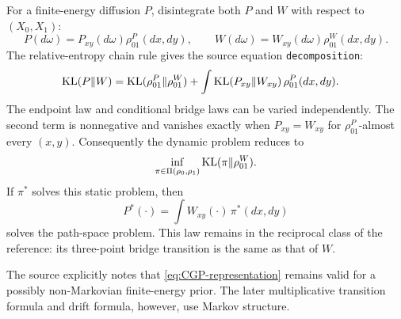 For a finite-energy diffusion $P$, disintegrate both $P$ and $W$ with respect to
$(X_0,X_1)$:
\[
 P(d\omega)=P_{xy}(d\omega)\rho^P_{01}(dx,dy),
 \qquad
 W(d\omega)=W_{xy}(d\omega)\rho^W_{01}(dx,dy).
\]
The relative-entropy chain rule gives the source equation \texttt{decomposition}:
\begin{align}
 \mathrm{KL}(P\|W)
 &=\mathrm{KL}(\rho^P_{01}\|\rho^W_{01})
 +\int\mathrm{KL}(P_{xy}\|W_{xy})\,\rho^P_{01}(dx,dy). \label{eq:CGP-decomp}
\end{align}
The endpoint law and conditional bridge laws can be varied independently.  The second term is
nonnegative and vanishes exactly when $P_{xy}=W_{xy}$ for $\rho^P_{01}$-almost every $(x,y)$.
Consequently the dynamic problem reduces to
\begin{equation}
 \inf_{\pi\in\Pi(\rho_0,\rho_1)}\mathrm{KL}(\pi\|\rho^W_{01}).
 \label{eq:CGP-static}
\end{equation}
If $\pi^*$ solves this static problem, then
\begin{equation}
 P^*(\cdot)=\int W_{xy}(\cdot)\,\pi^*(dx,dy)
 \label{eq:CGP-representation}
\end{equation}
solves the path-space problem.  This law remains in the reciprocal class of the reference: its
three-point bridge transition is the same as that of $W$.

\begin{remark}
The source explicitly notes that \eqref{eq:CGP-representation} remains valid for a possibly
non-Markovian finite-energy prior.  The later multiplicative transition formula and drift formula,
however, use Markov structure.
\end{remark}


